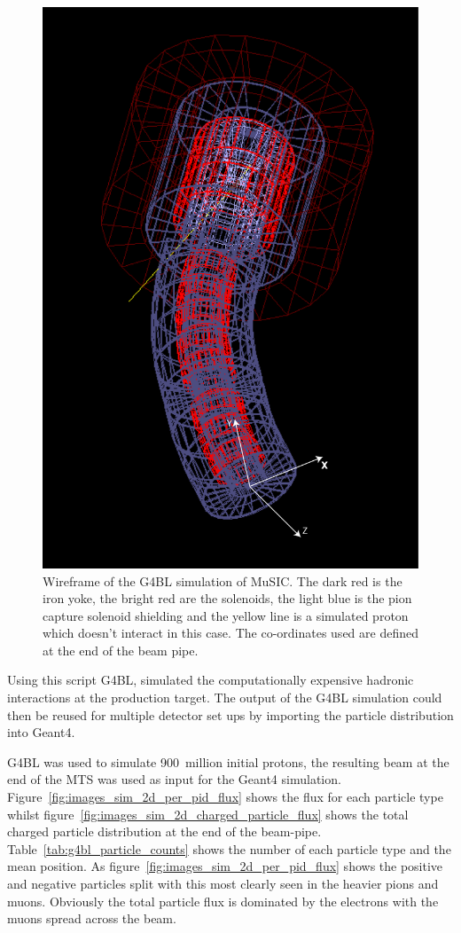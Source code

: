 \begin{figure}[hptb]
  \centering
    \includegraphics[width=.75\textwidth]{images/Geometry/g4bl_wireframe.png}
  \caption{Wireframe of the G4BL simulation of MuSIC. The dark red is the iron yoke, the bright red are the solenoids, the light blue is the pion capture solenoid shielding and the yellow line is a simulated proton which doesn't interact in this case. The co-ordinates used are defined at the end of the beam pipe.}
  \label{fig:images_Geometry_g4bl_wireframe}
\end{figure}

Using this script G4BL, simulated the computationally expensive hadronic interactions at the production target. The output of the G4BL simulation could then be reused for multiple detector set ups by importing the particle distribution into Geant4.

G4BL was used to simulate 900~million initial protons, the resulting beam at the end of the MTS was used as input for the Geant4 simulation. Figure~\ref{fig:images_sim_2d_per_pid_flux} shows the flux for each particle type whilst figure~\ref{fig:images_sim_2d_charged_particle_flux} shows the total charged particle distribution at the end of the beam-pipe. Table~\ref{tab:g4bl_particle_counts} shows the number of each particle type and the mean position. As figure~\ref{fig:images_sim_2d_per_pid_flux} shows the positive and negative particles split with this most clearly seen in the heavier pions and muons. Obviously the total particle flux is dominated by the electrons with the muons spread across the beam.


